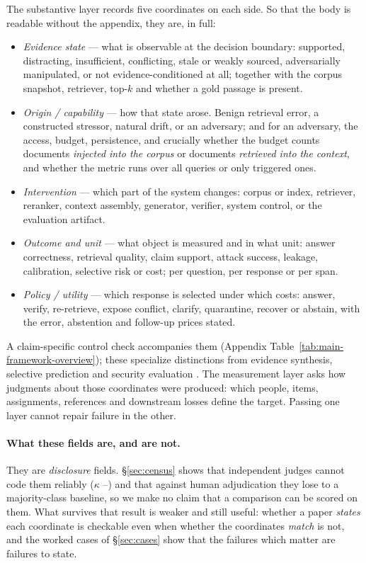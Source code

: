 \documentclass[11pt]{article}
\begin{document}
The substantive layer records five coordinates on each side. So that the body
is readable without the appendix, they are, in full:

\begin{itemize}[leftmargin=1.1em,itemsep=1pt,topsep=2pt,parsep=0pt]
\item[\textbf{C1}] \emph{Evidence state} --- what is observable at the decision
boundary: supported, distracting, insufficient, conflicting, stale or weakly
sourced, adversarially manipulated, or not evidence-conditioned at all;
together with the corpus snapshot, retriever, top-$k$ and whether a gold
passage is present.
\item[\textbf{C2}] \emph{Origin / capability} --- how that state arose. Benign
retrieval error, a constructed stressor, natural drift, or an adversary; and
for an adversary, the access, budget, persistence, and crucially whether the
budget counts documents \emph{injected into the corpus} or documents
\emph{retrieved into the context}, and whether the metric runs over all queries
or only triggered ones.
\item[\textbf{C3}] \emph{Intervention} --- which part of the system changes:
corpus or index, retriever, reranker, context assembly, generator, verifier,
system control, or the evaluation artifact.
\item[\textbf{C4}] \emph{Outcome and unit} --- what object is measured and in
what unit: answer correctness, retrieval quality, claim support, attack
success, leakage, calibration, selective risk or cost; per question, per
response or per span.
\item[\textbf{C5}] \emph{Policy / utility} --- which response is selected under
which costs: answer, verify, re-retrieve, expose conflict, clarify, quarantine,
recover or abstain, with the error, abstention and follow-up prices stated.
\end{itemize}

\noindent A claim-specific control check accompanies them (Appendix
Table~\ref{tab:main-framework-overview}); these specialize distinctions from
evidence synthesis, selective prediction and security evaluation
\citep{richardson1995pico,chow1970reject,papernot2018sok}. The measurement
layer asks how judgments about those coordinates were produced: which people,
items, assignments, references and downstream losses define the target. Passing
one layer cannot repair failure in the other.

\paragraph{What these fields are, and are not.}
They are \emph{disclosure} fields. \S\ref{sec:census} shows that independent
judges cannot code them reliably ($\kappa$ \DecCoordKMin{}--\DecCoordKMax{})
and that against human adjudication they lose to a majority-class baseline, so
we make no claim that a comparison can be scored on them. What survives that
result is weaker and still useful: whether a paper \emph{states} each
coordinate is checkable even when whether the coordinates \emph{match} is not,
and the worked cases of \S\ref{sec:cases} show that the failures which matter
are failures to state.
\end{document}

